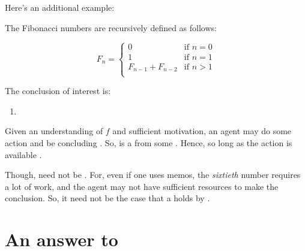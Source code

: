 \begin{note}
  Here's an additional example:

  \begin{scenario}%
    \label{scen:fc:fib}%
    The Fibonacci numbers are recursively defined as follows:

    \[
      F_{n} = \left\{
        \begin{array}{ll}
          0 & \text{if } n = 0 \\
          1 & \text{if } n = 1 \\
          F_{n-1} + F_{n-2} & \text{if } n > 1 \\
        \end{array}
      \right.
    \]
  \end{scenario}

  \noindent%
  The conclusion of interest is:
  \begin{enumerate}[label=C\thescenarioCounter., ref=(C\thescenarioCounter)]
  \item
    \label{scen:fc:fib:c}
  \end{enumerate}
  Given an understanding of \(f\) and sufficient motivation, an agent may do some action and be concluding .
  So,  is a \fc{} from some \pool{}.
  Hence, so long as the action is available .

  Though,  need not be .
  For, even if one uses memos, the \emph{sixtieth} number requires a lot of work, and the agent may not have sufficient resources to make the conclusion.
  So, it need not be the case that a \fingfr{} holds by \supportII{}.
\end{note}


\section{An answer to \qWhy{}}


